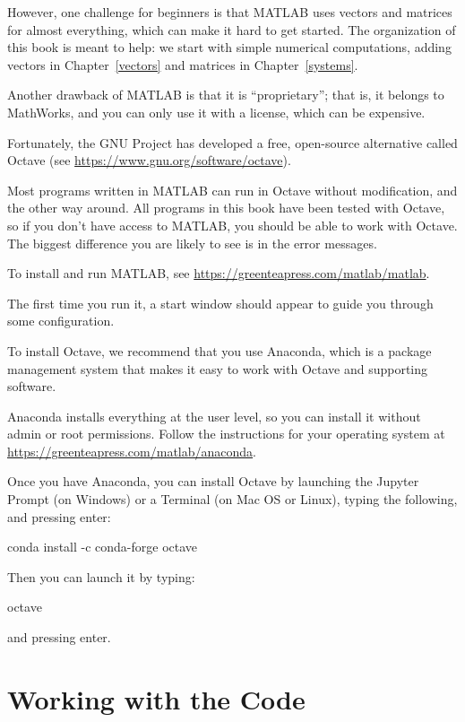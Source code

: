 However, one challenge for beginners is that MATLAB uses vectors and matrices for almost everything, which can make it hard to get started.  The organization of this book is meant to help: we start with simple numerical computations, adding vectors in Chapter~\ref{vectors} and matrices in Chapter~\ref{systems}.

Another drawback of MATLAB is that it is ``proprietary''; that is, it belongs to MathWorks, and you can only use it with a license, which can be expensive.

Fortunately, the GNU Project has developed a free, open-source alternative called Octave (see \url{https://www.gnu.org/software/octave}).

Most programs written in MATLAB can run in Octave without modification, and the other way around.  All programs in this book have been tested with Octave, so if you don't have access to MATLAB, you should be able to work with Octave.  The biggest difference you are likely to see is in the error messages.

To install and run MATLAB, see \url{https://greenteapress.com/matlab/matlab}.

The first time you run it, a start window should appear to guide you through some configuration.

To install Octave, we recommend that you use Anaconda, which is a package management system that makes it easy to work with Octave and supporting software.

Anaconda installs everything at the user level, so you can install it without admin or root permissions.  Follow the instructions for your operating system at \url{https://greenteapress.com/matlab/anaconda}.

Once you have Anaconda, you can install Octave by launching the Jupyter Prompt (on Windows) or a Terminal (on Mac OS or Linux), typing the following, and pressing \textsf{enter}:

\begin{code}
conda install -c conda-forge octave
\end{code}

Then you can launch it by typing:

\begin{code}
octave
\end{code}

and pressing \textsf{enter}.

\section{Working with the Code}


